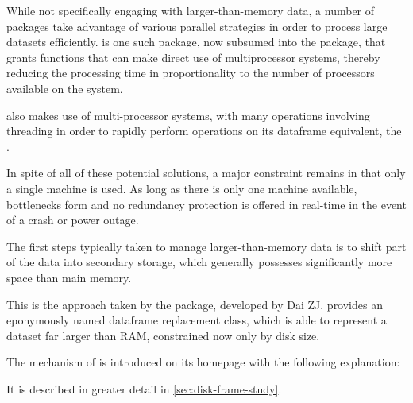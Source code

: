While not specifically engaging with larger-than-memory data, a number of packages take advantage of various parallel strategies in order to process large datasets efficiently.
 is one such
package, now subsumed into the  package, that grants
functions that can make direct use of multiprocessor systems, thereby
reducing the processing time in proportionality to the number of
processors available on the system.

 also makes use of multi-processor systems, with many
operations involving threading in order to rapidly perform operations on
its dataframe equivalent, the .

In spite of all of these potential solutions, a major constraint remains in that only a single machine is used.
As long as there is only one machine available, bottlenecks form and no redundancy protection is offered in real-time in the event of a crash or power outage.

The first steps typically taken to manage larger-than-memory data is to shift part of the data into secondary storage, which generally possesses significantly more space than main memory.

This is the approach taken by the  package, developed by Dai ZJ.
 provides an eponymously named dataframe
replacement class, which is able to represent a dataset far larger than
RAM, constrained now only by disk size\cite{zj20}.

The mechanism of  is introduced on its homepage with the following explanation:


It is described in greater detail in \cref{sec:disk-frame-study}.
